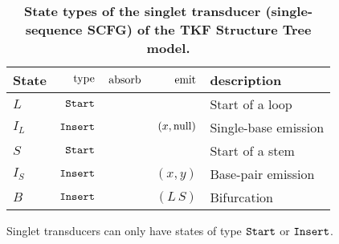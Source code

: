 \documentclass[10pt]{article}
\begin{document}
\begin{table}[!ht]
  \caption{
    \textbf{State types of the singlet transducer (single-sequence
      SCFG) of the TKF Structure Tree model.}}
  \begin{tabular}{|l|rrrl|}
    \hline
    State & $\operatorname{type}$ & $\operatorname{absorb}$ & $\operatorname{emit}$ & description \\ \hline
    $L$ & $\mathtt{Start}$ & & & Start of a loop \\ \hline
    $I_L$ & $\mathtt{Insert}$ & & $(x,\mathrm{null})$ & Single-base emission \\ \hline \hline
    $S$ & $\mathtt{Start}$ & & & Start of a stem \\ \hline
    $I_S$ & $\mathtt{Insert}$ & & $(x,y)$ & Base-pair emission \\ \hline \hline
    $B$ & $\mathtt{Insert}$ & & $(L\,S)$ & Bifurcation \\ \hline
  \end{tabular}
  \begin{flushleft}
    Singlet transducers can only have states of type $\mathtt{Start}$ or
    $\mathtt{Insert}$.
  \end{flushleft}
\end{table}
\end{document}
